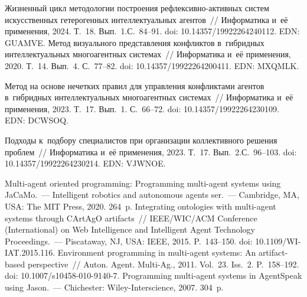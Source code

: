 \begin{multicols}{2}
{{\begin{thebibliography}{99}
   Жизненный цикл методологии построения  
реф\-лек\-сив\-но-ак\-тив\-ных сис\-тем искусственных гетерогенных интеллектуальных 
агентов~// Информатика и~её применения, 2024. Т.~18. Вып.~1.\linebreak С.~84--91.  doi: 
10.14357/19922264240112. EDN: \mbox{GUAMVE}.
    Метод визуального представления конфликтов 
в~гибридных интеллектуальных многоагентных сис\-те\-мах~// Информатика и~её 
применения, 2020. Т.~14. Вып.~4. С.~77--82. doi: 10.14357/19922264200411. EDN: MXQMLK.
  
    Метод на основе нечетких правил для управления 
конфликтами агентов в~гибридных интеллектуальных многоагентных сис\-те\-мах~// 
Информатика и~её применения, 2023. Т.~17. Вып.~1. С.~66--72. doi: 
10.14357/19922264230109. EDN: DCWSOQ.
  
    Подходы к~подбору специалистов при организации коллективного 
решения проб\-лем~// Информатика и~её применения, 2023. Т.~17. Вып.~2.\linebreak С.~96--103. doi: 
10.14357/19922264230214. EDN: VJWNOE.
  
   Multi-agent oriented programming: 
Programming multi-agent systems using JaCaMo.~--- Intelligent robotics and autonomous agents 
ser.~--- Cambridge, MA, USA: The MIT Press, 2020. 264~p.
Integrating ontologies with multi-agent systems through CArtAgO artifacts~// IEEE/WIC/ACM  
Conference (International) on Web Intelligence and Intelligent Agent Technology Proceedings.~--- Piscataway, 
NJ, USA: IEEE, 2015. P.~143--150. doi: 10.1109/WI-IAT.2015.116.
   Environment programming in multi-agent systems: An 
artifact-based perspective~// Auton. Agent. Multi-Ag., 2011. Vol.~23. Iss.~2. 
P.~158--192. doi: 
10.1007/s10458-010-9140-7.
   Programming  
multi-agent systems in AgentSpeak using Jason.~--- Chichester: Wiley-Interscience, 2007. 304~p.

\end{thebibliography}

 }
 }

\end{multicols}

